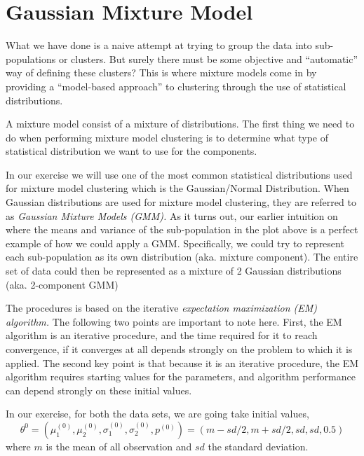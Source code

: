 \section{Gaussian Mixture Model}
What we have done is a naive attempt at trying to group the data into sub-populations or clusters.
But surely there must be some objective and “automatic” way of defining these clusters? This is where mixture models come in by providing a “model-based approach” to clustering through the use of statistical distributions.


A mixture model consist of a mixture of distributions. The first thing we need to do when performing mixture model clustering is to determine what type of statistical distribution we want to use for the components.

In our exercise we will use one of the most common statistical distributions used for mixture model clustering which is the Gaussian/Normal Distribution. When Gaussian distributions are used for mixture model clustering, they are referred to as \emph{Gaussian Mixture Models (GMM).} As it turns out, our earlier intuition on where the means and variance of the sub-population in the plot above is a perfect example of how we could apply a GMM. Specifically, we could try to represent each sub-population as its own distribution (aka. mixture component). The entire set of data could then be represented as a mixture of 2 Gaussian distributions (aka. 2-component GMM)

 The procedures is based on the iterative \emph{expectation maximization (EM) algorithm.} The following two points are important to note here. First, the EM algorithm is an iterative procedure, and the time required for it to reach convergence, if it converges at all depends strongly on the problem to which it is applied.  The second key point is that because it is an iterative procedure, the EM algorithm requires starting values for the parameters, and algorithm performance can depend strongly on these initial values.
 
 In our exercise, for both the data sets, we are going take initial values,
 $$\theta^ 0 =(\mu_{1}^{(0)},\mu_{2}^{(0)},\sigma_{1}^{(0)}, \sigma_{2}^{(0)},p^{(0)}) =(m-sd/2, m + sd/2, sd, sd, 0.5)$$
where $m$ is the mean of all observation and $sd$ the standard deviation.

